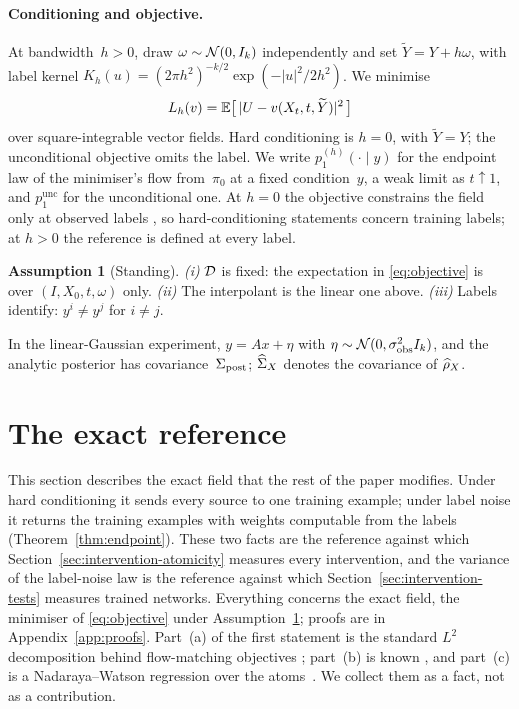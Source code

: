 \documentclass{article} %
\theoremstyle{plain}
\theoremstyle{definition}
\newtheorem{assumption}{Assumption}
\theoremstyle{remark}
\begin{document}
\paragraph{Conditioning and objective.} At bandwidth~$h>0$, draw $\omega\sim\mathcal{N}(0,I_k)$
independently and set $\widetilde Y=Y+h\omega$, with label kernel
$K_h(u)=(2\pi h^2)^{-k/2}\exp(-|u|^2/2h^2)$. We minimise
\begin{equation}
L_h(v)=\mathbb{E}\big[\,|U-v(X_t,t,\widetilde Y)|^2\,\big]
\label{eq:objective}
\end{equation}
over square-integrable vector fields. Hard conditioning is $h=0$, with $\widetilde Y=Y$; the
unconditional objective omits the label. We write $p_1^{(h)}(\cdot\mid y)$ for the endpoint law
of the minimiser's flow from~$\pi_0$ at a fixed condition~$y$, a weak limit as $t\uparrow1$,
and $p_1^{\mathrm{unc}}$ for the unconditional one. At $h=0$ the objective constrains the field
only at observed labels \citep[cf.][]{baptista2025memorization}, so hard-conditioning
statements concern training labels; at $h>0$ the reference is defined at every label.

\begin{assumption}[Standing]
\label{as:standing}
\emph{(i)} $\mathcal{D}$ is fixed: the expectation in \eqref{eq:objective} is over
$(I,X_0,t,\omega)$ only. \emph{(ii)} The interpolant is the linear one above.
\emph{(iii)} Labels identify: $y^i\neq y^j$ for $i\neq j$.
\end{assumption}

In the linear-Gaussian experiment, $y=Ax+\eta$ with $\eta\sim\mathcal{N}(0,\sigma_{\mathrm{obs}}^2I_k)$,
and the analytic posterior has covariance~$\Sigma_{\mathrm{post}}$; $\widehat{\Sigma}_X$ denotes the covariance of
$\widehat{\rho}_X$.

\section{The exact reference}
\label{sec:theory}

This section describes the exact field that the rest of the paper modifies. Under hard
conditioning it sends every source to one training example; under label noise it returns the
training examples with weights computable from the labels (Theorem~\ref{thm:endpoint}). These two
facts are the reference against which Section~\ref{sec:intervention-atomicity} measures every
intervention, and the variance of the label-noise law is the reference against which
Section~\ref{sec:intervention-tests} measures trained networks. Everything concerns the exact
field, the minimiser of \eqref{eq:objective} under Assumption~\ref{as:standing}; proofs are in
Appendix~\ref{app:proofs}. Part~(a) of the first statement is the standard $L^2$ decomposition
behind flow-matching objectives \citep{lipman2023flow,albergo2023building,liu2023rectified};
part~(b) is known \citep[Theorem~6.4]{baptista2025memorization}, and part~(c) is a
Nadaraya--Watson regression over the atoms~\citep{nadaraya1964estimating,watson1964smooth}.
We collect them as a fact, not as a contribution.
\end{document}
